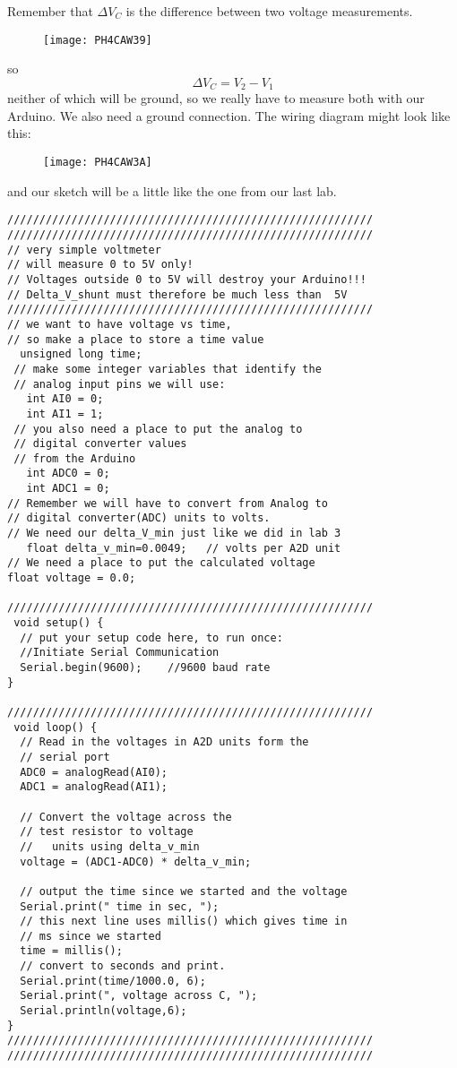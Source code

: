 Remember that $\Delta V_{C}$ is the difference between two voltage
measurements. \begin{figure}[h!]
\texttt{[image: PH4CAW39]}
\end{figure}so 
\begin{equation*}
\Delta V_{C}=V_{2}-V_{1}
\end{equation*}%
neither of which will be ground, so we really have to measure both with our
Arduino. We also need a ground connection. The wiring diagram might look
like this:\begin{figure}[h!]
\texttt{[image: PH4CAW3A]}
\end{figure}and our sketch will be a little
like the one from our last lab.
 \begin{lstlisting}[language=Arduino]
/////////////////////////////////////////////////////////
/////////////////////////////////////////////////////////
// very simple voltmeter 
// will measure 0 to 5V only!
// Voltages outside 0 to 5V will destroy your Arduino!!!
// Delta_V_shunt must therefore be much less than  5V
/////////////////////////////////////////////////////////
// we want to have voltage vs time,
// so make a place to store a time value
  unsigned long time;
 // make some integer variables that identify the 
 // analog input pins we will use:
   int AI0 = 0;
   int AI1 = 1;
 // you also need a place to put the analog to 
 // digital converter values 
 // from the Arduino
   int ADC0 = 0;
   int ADC1 = 0;
// Remember we will have to convert from Analog to 
// digital converter(ADC) units to volts.
// We need our delta_V_min just like we did in lab 3 
   float delta_v_min=0.0049;   // volts per A2D unit
// We need a place to put the calculated voltage
float voltage = 0.0;
 
/////////////////////////////////////////////////////////
 void setup() {
  // put your setup code here, to run once:
  //Initiate Serial Communication
  Serial.begin(9600);    //9600 baud rate
}
 
/////////////////////////////////////////////////////////
 void loop() {
  // Read in the voltages in A2D units form the
  // serial port
  ADC0 = analogRead(AI0); 
  ADC1 = analogRead(AI1);
  
  // Convert the voltage across the 
  // test resistor to voltage 
  //   units using delta_v_min
  voltage = (ADC1-ADC0) * delta_v_min;
 
  // output the time since we started and the voltage
  Serial.print(" time in sec, ");
  // this next line uses millis() which gives time in
  // ms since we started
  time = millis();
  // convert to seconds and print.
  Serial.print(time/1000.0, 6);  
  Serial.print(", voltage across C, ");
  Serial.println(voltage,6);
}
/////////////////////////////////////////////////////////
/////////////////////////////////////////////////////////
 
 \end{lstlisting}

